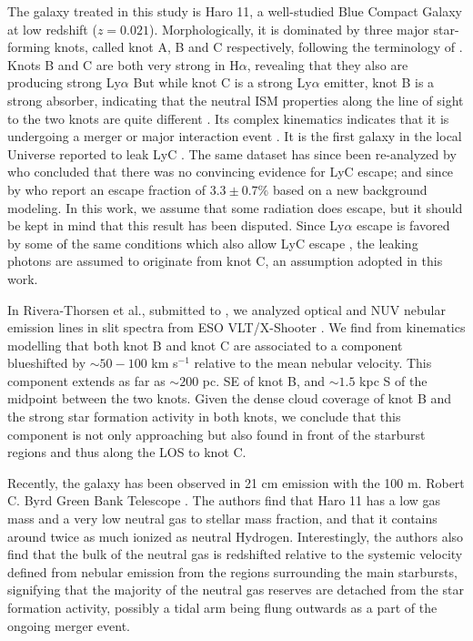 \documentclass[twocolumn,]{aastex61}
\begin{document}
The galaxy treated in this study is Haro 11, a well-studied Blue Compact Galaxy
at low redshift ($z = 0.021$). Morphologically, it is dominated by three major
star-forming knots, called knot A, B and C respectively, following the
terminology of \citet{Vader1993} \citep[see also][ and
fig.~\ref{fig:apert}]{Kunth1998, Hayes2007}.  Knots B and C are both very strong
in H$\alpha$, revealing that they also are producing strong Ly$\alpha$ 
But while knot C is a strong
Ly$\alpha$ emitter, knot B is a strong absorber, indicating that the neutral ISM
properties along the line of sight to the two knots are quite different
\citep{Hayes2009,Ostlin2009}.  Its complex kinematics indicates that it is
undergoing a merger or major interaction event \citep{Ostlin2001, Ostlin2015,
James2014}. It is the first galaxy in the local Universe reported to leak LyC
\citep{Bergvall2006}. The same dataset has since been re-analyzed by
\cite{Grimes2007} who concluded that there was no convincing evidence for LyC
escape; and since by \cite{Leitet2011} who report an escape fraction of $3.3 \pm
0.7 \%$ based on a new background modeling. In this work, we assume that some
radiation does escape, but it should be kept in mind that this result has been
disputed. Since Ly$\alpha$ escape is favored 
by some of the same conditions which also allow LyC escape 
\citep[see e.g. ][]{Hayes2015, DijkstraRev, Leitet2011}, the leaking photons 
are assumed to originate from knot C, an assumption adopted in this work.

In Rivera-Thorsen et al., submitted to \apj, we analyzed optical and NUV nebular
emission lines in slit spectra from ESO VLT/X-Shooter \citep[see
also][]{Guseva2012}. We find from kinematics modelling that both knot B and knot
C are associated to a component blueshifted by $\sim 50 - 100$ km s$^{-1}$
relative to the mean nebular velocity.  This component extends as far as $\sim
200$ pc. SE of knot B, and $\sim 1.5$ kpc S of the midpoint between the two
knots. Given the dense cloud coverage of knot B and the strong star formation
activity in both knots, we conclude that this component is not only approaching
but also found in front of the starburst regions and thus along the LOS to knot
C.

Recently, the galaxy has been observed in 21 cm  emission with
the 100 m. Robert C. Byrd Green Bank Telescope \citep{Pardy2016arXiv}.
The authors find that Haro 11 has a low gas mass and a very low neutral
gas to stellar mass fraction, and that it contains around twice as much
ionized as neutral Hydrogen. Interestingly, the authors also find that
the bulk of the neutral gas is redshifted relative to the systemic 
velocity defined from nebular emission from the  regions surrounding
the main starbursts, signifying that the majority of the neutral gas
reserves are detached from the star formation activity, possibly a tidal
arm being flung outwards as a part of the ongoing merger event.
\end{document}

